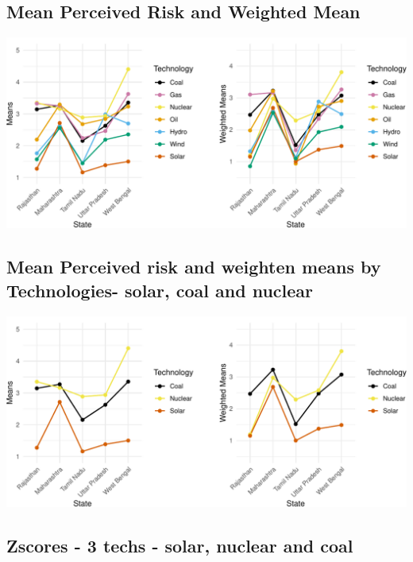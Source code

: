 \documentclass[
]{article}
\begin{document}
\newpage

\hypertarget{mean-perceived-risk-and-weighted-mean}{%
\subsection{Mean Perceived Risk and Weighted
Mean}\label{mean-perceived-risk-and-weighted-mean}}

\includegraphics[width=1\linewidth,height=1\textheight]{nuclear-in-comparison_files/figure-latex/unnamed-chunk-24-1}

\newpage

\hypertarget{mean-perceived-risk-and-weighten-means-by-technologies--solar-coal-and-nuclear}{%
\subsection{Mean Perceived risk and weighten means by Technologies-
solar, coal and
nuclear}\label{mean-perceived-risk-and-weighten-means-by-technologies--solar-coal-and-nuclear}}

\includegraphics[width=1\linewidth,height=1\textheight]{nuclear-in-comparison_files/figure-latex/unnamed-chunk-28-1}

\hypertarget{zscores---3-techs---solar-nuclear-and-coal}{%
\subsection{Zscores - 3 techs - solar, nuclear and
coal}\label{zscores---3-techs---solar-nuclear-and-coal}}
\end{document}
